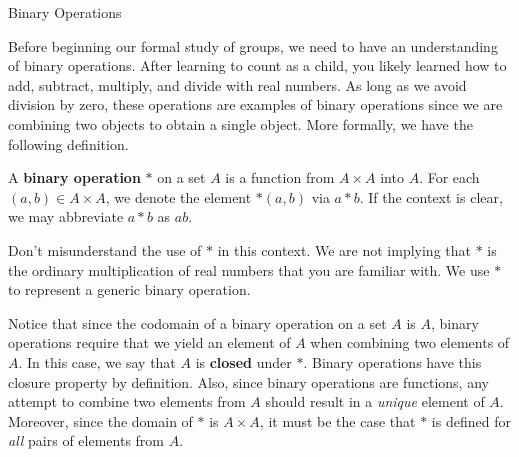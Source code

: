 \begin{section}{Binary Operations}


Before beginning our formal study of groups, we need to have an understanding of binary operations. After learning to count as a child, you likely learned how to add, subtract, multiply, and divide with real numbers.  As long as we avoid division by zero, these operations are examples of binary operations since we are combining two objects to obtain a single object.  More formally, we have the following definition.

\begin{definition}
A \textbf{binary operation} $*$ on a set $A$ is a function from $A\times A$ into $A$.  For each $(a,b)\in A\times A$, we denote the element $*(a,b)$ via $a*b$.  If the context is clear, we may abbreviate $a*b$ as $ab$.
\end{definition}

Don't misunderstand the use of $*$ in this context.  We are not implying that $*$ is the ordinary multiplication of real numbers that you are familiar with.  We use $*$ to represent a generic binary operation.  

Notice that since the codomain of a binary operation on a set $A$ is $A$, binary operations require that we yield an element of $A$ when combining two elements of $A$.  In this case, we say that $A$ is \textbf{closed} under $*$.  Binary operations have this closure property by definition.  Also, since binary operations are functions, any attempt to combine two elements from $A$ should result in a \emph{unique} element of $A$.  Moreover, since the domain of $*$ is $A\times A$, it must be the case that $*$ is defined for \emph{all} pairs of elements from $A$.


\end{section}
